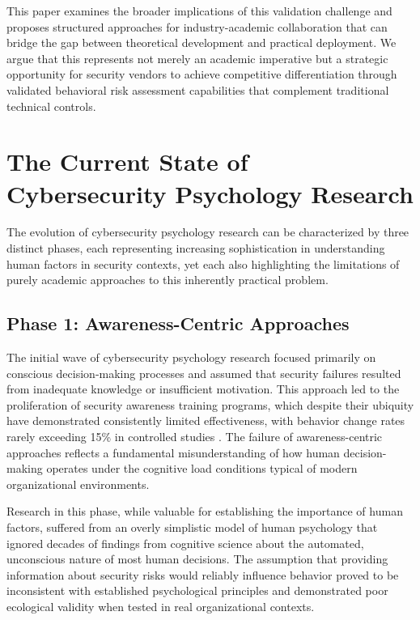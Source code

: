 \documentclass[10pt,twocolumn]{IEEEtran}
\begin{document}
This paper examines the broader implications of this validation challenge and proposes structured approaches for industry-academic collaboration that can bridge the gap between theoretical development and practical deployment. We argue that this represents not merely an academic imperative but a strategic opportunity for security vendors to achieve competitive differentiation through validated behavioral risk assessment capabilities that complement traditional technical controls.

\section{The Current State of Cybersecurity Psychology Research}

The evolution of cybersecurity psychology research can be characterized by three distinct phases, each representing increasing sophistication in understanding human factors in security contexts, yet each also highlighting the limitations of purely academic approaches to this inherently practical problem.

\subsection{Phase 1: Awareness-Centric Approaches}

The initial wave of cybersecurity psychology research focused primarily on conscious decision-making processes and assumed that security failures resulted from inadequate knowledge or insufficient motivation. This approach led to the proliferation of security awareness training programs, which despite their ubiquity have demonstrated consistently limited effectiveness, with behavior change rates rarely exceeding 15\% in controlled studies \cite{sans2023}. The failure of awareness-centric approaches reflects a fundamental misunderstanding of how human decision-making operates under the cognitive load conditions typical of modern organizational environments.

Research in this phase, while valuable for establishing the importance of human factors, suffered from an overly simplistic model of human psychology that ignored decades of findings from cognitive science about the automated, unconscious nature of most human decisions. The assumption that providing information about security risks would reliably influence behavior proved to be inconsistent with established psychological principles and demonstrated poor ecological validity when tested in real organizational contexts.
\end{document}
